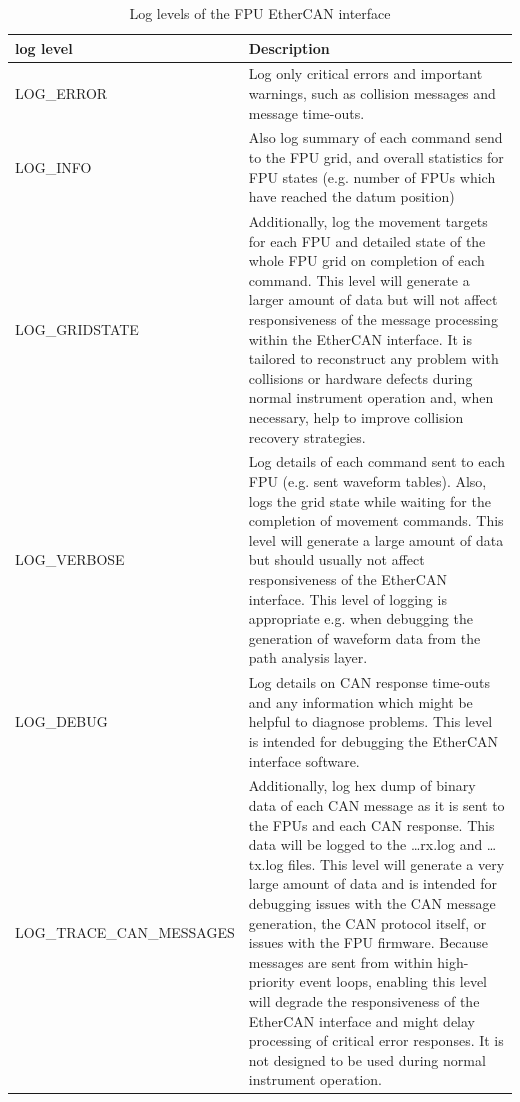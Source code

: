 \documentclass[11pt,a4paper]{scrartcl}
\begin{document}
\begin{table}
  \begin{centering}
\begin{tabular}{|l|p{}|}
  \hline
  \textbf{log level} & \textbf{Description} \\
  \hline
    LOG\_ERROR & 
    Log only critical errors and important warnings, such as collision
    messages and message time-outs. \\

    \hline
    LOG\_INFO & 
    Also log summary of each command send to the FPU grid, and
    overall statistics for FPU states (e.g. number of FPUs which
    have reached the datum position) \\

    \hline
    LOG\_GRIDSTATE &
    Additionally, log the movement targets for each
    FPU and detailed state of the whole FPU grid on completion of each
    command.  This level will generate a larger amount of data but
    will not affect responsiveness of the message processing within
    the EtherCAN interface.  It is tailored to reconstruct any problem with
    collisions or hardware defects during normal instrument operation
    and, when necessary, help to improve collision recovery
    strategies. \\

    \hline
    LOG\_VERBOSE &

    Log details of each command sent to each FPU
    (e.g. sent waveform tables). Also, logs the grid state while
    waiting for the completion of movement commands. This level will
    generate a large amount of data but should usually not affect
    responsiveness of the EtherCAN interface. This level of logging is appropriate
    e.g. when debugging the generation of waveform data from the path
    analysis layer. \\

    \hline
    LOG\_DEBUG &
    Log details on CAN response time-outs and any information which
    might be helpful to diagnose problems. This level is intended
    for debugging the EtherCAN interface software.\\

    \hline LOG\_TRACE\_CAN\_MESSAGES & Additionally, log hex dump of
    binary data of each CAN message as it is sent to the FPUs and each
    CAN response. This data will be logged to the \ldots{}rx.log and
    \ldots{}tx.log files. This level will generate a very large amount
    of data and is intended for debugging issues with the CAN message
    generation, the CAN protocol itself, or issues with the FPU
    firmware. Because messages are sent from within high-priority
    event loops, enabling this level will degrade the responsiveness
    of the EtherCAN interface and might delay processing of critical error
    responses. It is not designed to be used during normal instrument
    operation. \\
 
  
  \hline
\end{tabular}
\end{centering}
\caption{Log levels of the FPU EtherCAN interface}
\label{tab:loglevels}
\end{table}
\end{document}
